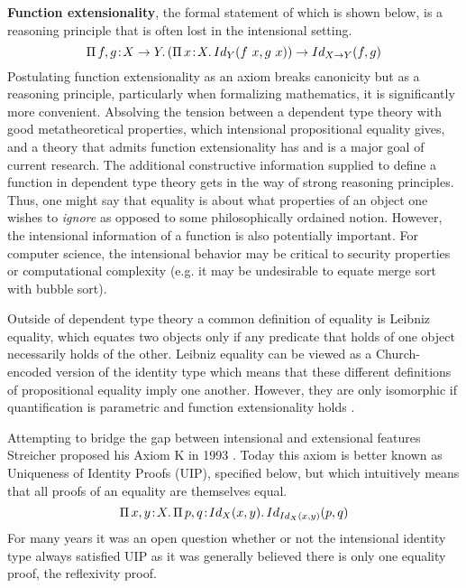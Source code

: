 \textbf{Function extensionality}, the formal statement of which is shown below, is a reasoning principle that is often lost in the intensional setting.
$${\Pi}\, f, g\! : \! X \to Y.\, 
    ({\Pi}\, x\! : \! X.\, Id_Y(f\ x, g\ x)) \to Id_{X \to Y}(f, g)
$$
Postulating function extensionality as an axiom breaks canonicity but as a reasoning principle, particularly when formalizing mathematics, it is significantly more convenient.
Absolving the tension between a dependent type theory with good metatheoretical properties, which intensional propositional equality gives, and a theory that admits function extensionality has and is a major goal of current research.
The additional constructive information supplied to define a function in dependent type theory gets in the way of strong reasoning principles.
Thus, one might say that equality is about what properties of an object one wishes to \textit{ignore} as opposed to some philosophically ordained notion.
However, the intensional information of a function is also potentially important.
For computer science, the intensional behavior may be critical to security properties or computational complexity (e.g. it may be undesirable to equate merge sort with bubble sort).

Outside of dependent type theory a common definition of equality is Leibniz equality, which equates two objects only if any predicate that holds of one object necessarily holds of the other.
Leibniz equality can be viewed as a Church-encoded version of the identity type which means that these different definitions of propositional equality imply one another.
However, they are only isomorphic if quantification is parametric and function extensionality holds \cite{abel2020_equality}.

Attempting to bridge the gap between intensional and extensional features Streicher proposed his Axiom K in 1993 \cite{streicher1993}.
Today this axiom is better known as Uniqueness of Identity Proofs (UIP), specified below, but which intuitively means that all proofs of an equality are themselves equal.
$$\abs{\Pi}{x, y}{X}{
    \abs{\Pi}{p, q}{Id_X(x, y)}{
        Id_{Id_X(x, y)}(p, q)
    }
}$$
For many years it was an open question whether or not the intensional identity type always satisfied UIP as it was generally believed there is only one equality proof, the reflexivity proof.

